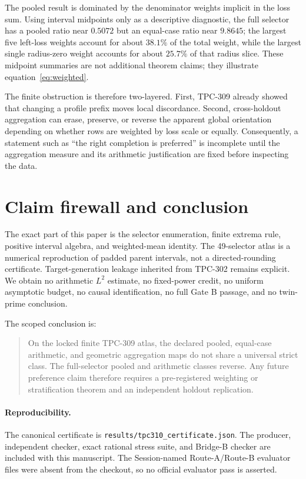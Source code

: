 \documentclass[10pt,a4paper]{article}
\begin{document}
The pooled result is dominated by the denominator weights implicit in the loss
sum.  Using interval midpoints only as a descriptive diagnostic, the full
selector has a pooled ratio near $0.5072$ but an equal-case ratio near $9.8645$;
the largest five left-loss weights account for about $38.1\%$ of the total
weight, while the largest single radius-zero weight accounts for about $25.7\%$
of that radius slice.  These midpoint summaries are not additional theorem
claims; they illustrate equation~\eqref{eq:weighted}.

The finite obstruction is therefore two-layered.  First, TPC-309 already
showed that changing a profile prefix moves local discordance.  Second,
cross-holdout aggregation can erase, preserve, or reverse the apparent global
orientation depending on whether rows are weighted by loss scale or equally.
Consequently, a statement such as ``the right completion is preferred'' is
incomplete until the aggregation measure and its arithmetic justification are
fixed before inspecting the data.

\section{Claim firewall and conclusion}

The exact part of this paper is the selector enumeration, finite extrema rule,
positive interval algebra, and weighted-mean identity.  The 49-selector atlas
is a numerical reproduction of padded parent intervals, not a directed-rounding
certificate.  Target-generation leakage inherited from TPC-302 remains
explicit.  We obtain no arithmetic $L^2$ estimate, no fixed-power credit, no
uniform asymptotic budget, no causal identification, no full Gate B passage,
and no twin-prime conclusion.

The scoped conclusion is:
\begin{quote}
On the locked finite TPC-309 atlas, the declared pooled, equal-case arithmetic,
and geometric aggregation maps do not share a universal strict class.  The
full-selector pooled and arithmetic classes reverse.  Any future preference
claim therefore requires a pre-registered weighting or stratification theorem
and an independent holdout replication.
\end{quote}

\paragraph{Reproducibility.}
The canonical certificate is
\texttt{results/tpc310\_certificate.json}.  The producer, independent checker,
exact rational stress suite, and Bridge-B checker are included with this
manuscript.  The Session-named Route-A/Route-B evaluator files were absent from
the checkout, so no official evaluator pass is asserted.


\begingroup\small

\endgroup
\end{document}
